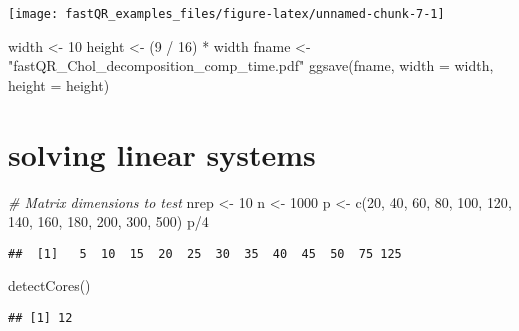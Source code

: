 \documentclass[]{tufte-handout}
\newenvironment{Shaded}{}{}
\newcommand{\AttributeTok}[1]{\textcolor[rgb]{0.49,0.56,0.16}{#1}}
\newcommand{\CommentTok}[1]{\textcolor[rgb]{0.38,0.63,0.69}{\textit{#1}}}
\newcommand{\DecValTok}[1]{\textcolor[rgb]{0.25,0.63,0.44}{#1}}
\newcommand{\FunctionTok}[1]{\textcolor[rgb]{0.02,0.16,0.49}{#1}}
\newcommand{\NormalTok}[1]{#1}
\newcommand{\OtherTok}[1]{\textcolor[rgb]{0.00,0.44,0.13}{#1}}
\newcommand{\SpecialCharTok}[1]{\textcolor[rgb]{0.25,0.44,0.63}{#1}}
\newcommand{\StringTok}[1]{\textcolor[rgb]{0.25,0.44,0.63}{#1}}
\begin{document}
\texttt{[image: fastQR\_examples\_files/figure-latex/unnamed-chunk-7-1]}

\begin{Shaded}
\begin{Highlighting}[]
\NormalTok{width   }\OtherTok{\textless{}{-}} \DecValTok{10}
\NormalTok{height  }\OtherTok{\textless{}{-}}\NormalTok{ (}\DecValTok{9} \SpecialCharTok{/} \DecValTok{16}\NormalTok{) }\SpecialCharTok{*}\NormalTok{ width}
\NormalTok{fname   }\OtherTok{\textless{}{-}} \StringTok{"fastQR\_Chol\_decomposition\_comp\_time.pdf"}
\FunctionTok{ggsave}\NormalTok{(fname, }\AttributeTok{width =}\NormalTok{ width, }\AttributeTok{height =}\NormalTok{ height)}
\end{Highlighting}
\end{Shaded}

\hypertarget{solving-linear-systems}{%
\section{solving linear systems}\label{solving-linear-systems}}

\begin{Shaded}
\begin{Highlighting}[]
\CommentTok{\# Matrix dimensions to test}
\NormalTok{nrep }\OtherTok{\textless{}{-}} \DecValTok{10}
\NormalTok{n    }\OtherTok{\textless{}{-}} \DecValTok{1000}
\NormalTok{p    }\OtherTok{\textless{}{-}} \FunctionTok{c}\NormalTok{(}\DecValTok{20}\NormalTok{, }\DecValTok{40}\NormalTok{, }\DecValTok{60}\NormalTok{, }\DecValTok{80}\NormalTok{, }\DecValTok{100}\NormalTok{, }\DecValTok{120}\NormalTok{, }\DecValTok{140}\NormalTok{, }\DecValTok{160}\NormalTok{, }\DecValTok{180}\NormalTok{, }\DecValTok{200}\NormalTok{, }\DecValTok{300}\NormalTok{, }\DecValTok{500}\NormalTok{)}
\NormalTok{p}\SpecialCharTok{/}\DecValTok{4}
\end{Highlighting}
\end{Shaded}

\begin{verbatim}
##  [1]   5  10  15  20  25  30  35  40  45  50  75 125
\end{verbatim}

\begin{Shaded}
\begin{Highlighting}[]
\FunctionTok{detectCores}\NormalTok{()}
\end{Highlighting}
\end{Shaded}

\begin{verbatim}
## [1] 12
\end{verbatim}
\end{document}
